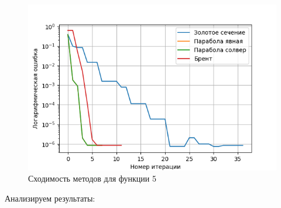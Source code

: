 \documentclass[a4paper,12pt]{article}
\begin{document}
\begin{figure}[H]
    \centering
    \begin{minipage}{0.49\textwidth}
        \centering \includegraphics[width=\textwidth]{images/task1/f5.png}
        \caption{Сходимость методов для функции 5}
    \end{minipage}
\end{figure}
Анализируем результаты:
\end{document}
